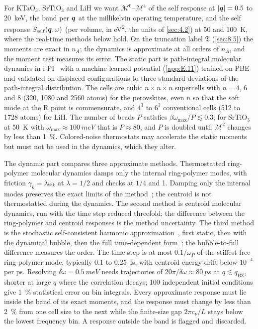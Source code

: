 For KTaO$_3$, SrTiO$_3$ and LiH we want $\mathscr{M}^0$--$\mathscr{M}^4$ of the self response at $|\bm{q}| = 0.5$ to \SI{20}{keV}, the band per $\bm{q}$ at the millikelvin operating temperature, and the self response $S_{\mathrm{self}}(\bm{q},\omega)$ (per volume, in \si{eV^2}, the units of \cref{sec:4.2}) at 50 and \SI{100}{K}, where the real-time methods below hold. On the truncation label $\mathfrak{T}$ (\cref{sec:8.5}) the moments are exact in $n_A$; the dynamics is approximate at all orders of $n_A$, and the moment test measures its error. The static part is path-integral molecular dynamics in i-PI~\cite{kapil2019ipi} with a machine-learned potential (\cref{app:E.11}) trained on PBE and validated on displaced configurations to three standard deviations of the path-integral distribution. The cells are cubic $n\times n\times n$ supercells with $n = 4$, 6 and 8 (320, 1080 and 2560 atoms) for the perovskites, even $n$ so that the soft mode at the R point is commensurate, and $4^3$ to $6^3$ conventional cells (512 to 1728 atoms) for LiH. The number of beads $P$ satisfies $\beta\omega_{\mathrm{max}}/P \lesssim 0.3$; for SrTiO$_3$ at \SI{50}{K} with $\omega_{\mathrm{max}} \approx \SI{100}{meV}$ that is $P \approx 80$, and $P$ is doubled until $\mathscr{M}^2$ changes by less than \SI{1}{\percent}. Colored-noise thermostats may accelerate the static moments but must not be used in the dynamics, which they alter.

The dynamic part compares three approximate methods. Thermostatted ring-polymer molecular dynamics damps only the internal ring-polymer modes, with friction $\gamma_k = \lambda\omega_k$ at $\lambda = 1/2$ and checks at $1/4$ and 1. Damping only the internal modes preserves the exact limits of the method~\cite{rossi2014remove}; the centroid is not thermostatted during the dynamics. The second method is centroid molecular dynamics, run with the time step reduced threefold; the difference between the ring-polymer and centroid responses is the method uncertainty. The third method is the stochastic self-consistent harmonic approximation~\cite{monacelli2021stochastic}, first static, then with the dynamical bubble, then the full time-dependent form~\cite{monacelli2021time}; the bubble-to-full difference measures the order. The time step is at most $0.1/\omega_P$ of the stiffest free ring-polymer mode, typically 0.1 to \SI{0.25}{fs}, with centroid energy drift below $10^{-4}$ per ps. Resolving $\delta\omega = \SI{0.5}{meV}$ needs trajectories of $20\pi/\delta\omega \approx \SI{80}{ps}$ at $q \lesssim q_{\mathrm{BZ}}$, shorter at large $q$ where the correlation decays; 100 independent initial conditions give \SI{1}{\percent} statistical error on bin integrals. Every approximate response must lie inside the band of its exact moments, and the response must change by less than \SI{2}{\percent} from one cell size to the next while the finite-size gap $2\pi c_\nu/L$ stays below the lowest frequency bin. A response outside the band is flagged and discarded.

